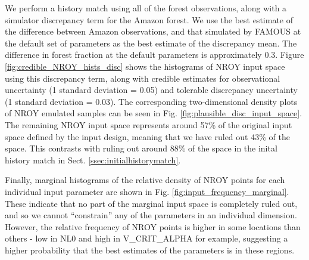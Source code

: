\documentclass[esd, article]{copernicus} %
\begin{document}
We perform a history match using all of the forest observations, along with a simulator discrepancy term for the Amazon forest. We use the best estimate of the difference between Amazon observations, and that simulated by FAMOUS at the default set of parameters as the best estimate of the discrepancy mean. The difference in forest fraction at the default parameters is approximately 0.3. Figure \ref{fig:credible_NROY_hists_disc} shows the histograms of NROY input space using this discrepancy term, along with credible estimates for observational uncertainty (1 standard deviation = 0.05) and tolerable discrepancy uncertainty (1 standard deviation = 0.03). The corresponding two-dimensional density plots of NROY emulated samples can be seen in Fig.  \ref{fig:plausible_disc_input_space}. The remaining NROY input space represents around 57\% of the original input space defined by the input design, meaning that we have ruled out 43\% of the space. This contrasts with ruling out around 88\% of the space in the inital history match in Sect. \ref{ssec:initialhistorymatch}.

Finally, marginal histograms of the relative density of NROY points for each individual input parameter are shown in Fig.  \ref{fig:input_frequency_marginal}. These indicate that no part of the marginal input space is completely ruled out, and so we cannot ``constrain'' any of the parameters in an individual dimension. However, the relative frequency of NROY points is higher in some locations than others - low in NL0 and high in V\_CRIT\_ALPHA for example, suggesting a higher probability that the best estimates of the parameters is in these regions.

 

\end{document}
